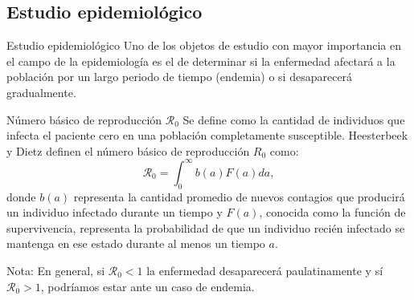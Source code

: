 \documentclass[9pt]{beamer}
\begin{document}
\subsection{Estudio epidemiológico}
\begin{frame}{Estudio epidemiológico}
Uno de los objetos de estudio con mayor importancia en el campo de la epidemiología es el de determinar si la enfermedad afectará a la población por un largo periodo de tiempo (endemia) o si desaparecerá gradualmente.
\begin{block}{Número básico de reproducción $\mathcal{R}_0$}
Se define como la cantidad de individuos que infecta el paciente cero en una población completamente susceptible. Heesterbeek y Dietz definen el número básico de reproducción $R_0$ como:
\begin{equation}\label{eq:R0}
    \mathcal{R}_0 = \int_0^\infty b(a)F(a) da,
\end{equation}
donde $b(a)$ representa la cantidad promedio de nuevos contagios que producirá un individuo infectado durante un tiempo y $F(a)$, conocida como la función de supervivencia, representa la probabilidad de que un individuo recién infectado se mantenga en ese estado durante al menos un tiempo $a$. \cite{conceptOfR0, perspectivesOnR0}
\end{block}
\begin{exampleblock}{Nota:}
En general, si $\mathcal{R}_0<1$ la enfermedad desaparecerá paulatinamente y sí $\mathcal{R}_0>1$, podríamos estar ante un caso de endemia.
\end{exampleblock}
\end{frame}
\end{document}
